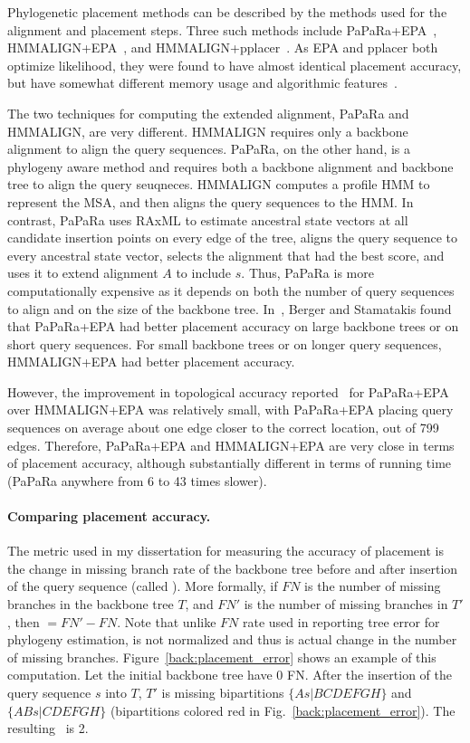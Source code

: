 Phylogenetic placement methods can be described by the methods used for the alignment and placement steps.  Three such methods include PaPaRa+EPA~\cite{Berger2011}, HMMALIGN+EPA~\cite{Berger2011a}, and HMMALIGN+pplacer~\cite{Matsen2010}.  As EPA and pplacer both optimize likelihood, they were found to have almost identical 
placement accuracy, but have somewhat
different memory usage and algorithmic features~\cite{Matsen2010}.


The two techniques for computing the extended alignment,
PaPaRa and HMMALIGN, are very different.  HMMALIGN requires only a backbone alignment to align the query sequences.  PaPaRa, on the other hand, is a phylogeny aware method and requires both a backbone alignment and backbone tree to align the query seuqneces.
HMMALIGN computes a profile HMM to represent the MSA, and then aligns the query sequences to the HMM.  In contrast,
PaPaRa uses RAxML to estimate ancestral state 
vectors at all candidate insertion points on every edge of the 
tree, aligns the query sequence to every ancestral state
vector, selects the alignment that had the best score, and uses
it to extend
alignment $A$ to include $s$.  Thus, PaPaRa is more computationally expensive as it depends on both the number of query sequences to align and on the size of the backbone tree.  In~\cite{Berger2011a}, Berger and Stamatakis found that 
PaPaRa+EPA had better placement accuracy on large backbone trees or on short query sequences.  For small backbone trees or on longer query sequences, HMMALIGN+EPA had better placement accuracy.  

However, the improvement in topological accuracy reported~\cite{Berger2011a} for
PaPaRa+EPA over HMMALIGN+EPA was
relatively small, with PaPaRa+EPA placing
query sequences on average
about one edge closer to the correct
location, out of 799 edges. 
Therefore, PaPaRa+EPA and HMMALIGN+EPA are very close
in terms of placement accuracy, although substantially different
in terms of running time (PaPaRa anywhere from 6 to 43 times slower).  

\paragraph{Comparing placement accuracy.}  
The metric used in my dissertation for measuring the accuracy of placement is the change in missing branch rate of the backbone tree before and after insertion of the query sequence (called \deltafn ).  More formally, if $FN$ is the number of missing branches in the backbone tree $T$, and $FN'$ is the number of missing branches in $T'$, then \deltafn$=FN'-FN$.  Note that unlike $FN$ rate used in reporting tree error for phylogeny estimation, \deltafn is not normalized and thus is actual change in the number of missing branches.  Figure~\ref{back:placement_error} shows an example of this computation.  Let the initial backbone tree have 0 FN.  After the insertion of the query sequence $s$ into $T$, $T'$ is missing bipartitions $\{As|BCDEFGH\}$ and $\{ABs|CDEFGH\}$ (bipartitions colored red in Fig.~\ref{back:placement_error}).  The resulting \deltafn~is 2.

